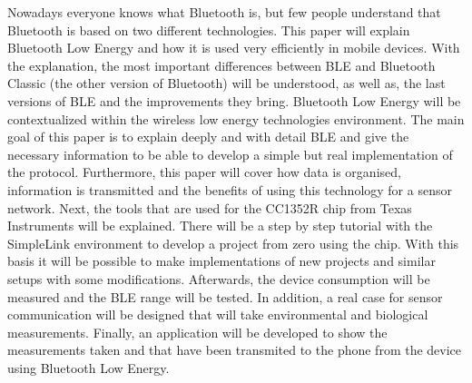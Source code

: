 \documentclass[catalan,final]{setup/eetac_tfc_pfc}
\begin{document}
\begin{overview}{1cm}
Nowadays everyone knows what Bluetooth is, but few people understand that Bluetooth is based on two different technologies. This paper will explain Bluetooth Low Energy and how it is used very efficiently in mobile devices.
\newline
\newline
With the explanation, the most important differences between BLE and Bluetooth Classic (the other version of Bluetooth) will be understood, as well as, the last versions of BLE and the improvements they bring.
Bluetooth Low Energy will be contextualized within the wireless low energy technologies environment.
\newline
\newline
The main goal of this paper is to explain deeply and with detail BLE and give the necessary information to be able to develop a simple but real implementation of the protocol. 
Furthermore, this paper will cover how data is organised, information is transmitted and the benefits of using this technology for a sensor network.
\newline
\newline
Next, the tools that are used for the CC1352R chip from Texas Instruments will be explained.
There will be a step by step tutorial with the SimpleLink environment to develop a project from zero using the chip.
With this basis it will be possible to make implementations of new projects and similar setups with some modifications. 
\newline
\newline
Afterwards, the device consumption will be measured and the BLE range will be tested.
In addition, a real case for sensor communication will be designed that will take environmental and biological measurements.
Finally, an application will be developed to show the measurements taken and that have been transmited to the phone from the device using Bluetooth Low Energy.
\end{overview}


\end{document}
